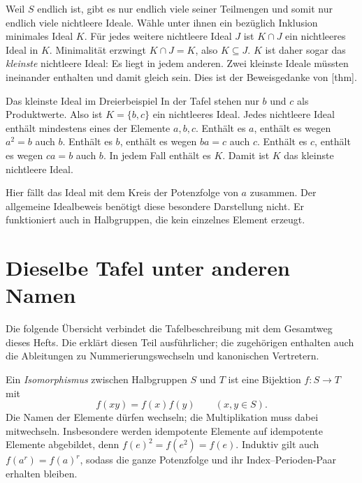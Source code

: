 Weil \(S\) endlich ist, gibt es nur endlich viele seiner Teilmengen
und somit nur endlich viele nichtleere Ideale. Wähle unter ihnen
ein bezüglich Inklusion minimales Ideal \(K\). Für jedes weitere
nichtleere Ideal \(J\) ist \(K\cap J\) ein nichtleeres Ideal in \(K\).
Minimalität erzwingt \(K\cap J=K\), also \(K\subseteq J\).
\(K\) ist daher sogar das \emph{kleinste} nichtleere Ideal:
Es liegt in jedem anderen. Zwei kleinste Ideale müssten ineinander
enthalten und damit gleich sein. Dies ist der Beweisgedanke von
[thm].

\begin{FiniteSemigroupsReadingExample}{Das kleinste Ideal im Dreierbeispiel}
In der Tafel stehen nur \(b\) und \(c\) als Produktwerte. Also ist
\(K=\{b,c\}\) ein nichtleeres Ideal. Jedes nichtleere Ideal enthält
mindestens eines der Elemente \(a,b,c\). Enthält es \(a\), enthält es
wegen \(a^2=b\) auch \(b\). Enthält es \(b\), enthält es wegen
\(ba=c\) auch \(c\). Enthält es \(c\), enthält es wegen \(ca=b\)
auch \(b\). In jedem Fall enthält es \(K\). Damit ist \(K\) das
kleinste nichtleere Ideal.

Hier fällt das Ideal mit dem Kreis der Potenzfolge von \(a\) zusammen.
Der allgemeine Idealbeweis benötigt diese besondere Darstellung nicht.
Er funktioniert auch in Halbgruppen, die kein einzelnes Element erzeugt.
\end{FiniteSemigroupsReadingExample}

\section*{Dieselbe Tafel unter anderen Namen}

Die folgende Übersicht verbindet die Tafelbeschreibung mit dem Gesamtweg
dieses Hefts. Die \TableIsomorphismsReadingLink{} erklärt diesen Teil
ausführlicher; die zugehörigen \TableIsomorphismsProofsLink{} enthalten
auch die Ableitungen zu Nummerierungswechseln und kanonischen Vertretern.

\hypertarget{finite-semigroups.reading.tables}{}

Ein \emph{Isomorphismus} zwischen Halbgruppen \(S\) und \(T\) ist eine
Bijektion \(f\colon S\to T\) mit
\[
  f(xy)=f(x)f(y)\qquad(x,y\in S).
\]
Die Namen der Elemente dürfen wechseln; die Multiplikation muss dabei
mitwechseln. Insbesondere werden idempotente Elemente auf idempotente
Elemente abgebildet, denn \(f(e)^2=f(e^2)=f(e)\).
Induktiv gilt auch \(f(a^r)=f(a)^r\), sodass die ganze Potenzfolge
und ihr Index--Perioden-Paar erhalten bleiben.

